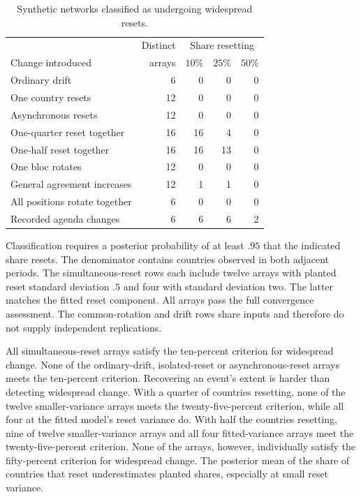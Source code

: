 \documentclass[10pt,authoryear]{elsarticle}
\begin{document}
\begin{table}[ht]
\centering
\small
\caption{Synthetic networks classified as undergoing widespread resets.}
\label{tab:synthetic_results}
\begin{tabular}{lrrrr}
\toprule
 & Distinct & \multicolumn{3}{c}{Share resetting} \\
Change introduced & arrays & $10\%$ & $25\%$ & $50\%$ \\
\midrule
Ordinary drift & 6 & 0 & 0 & 0 \\
One country resets & 12 & 0 & 0 & 0 \\
Asynchronous resets & 12 & 0 & 0 & 0 \\
One-quarter reset together & 16 & 16 & 4 & 0 \\
One-half reset together & 16 & 16 & 13 & 0 \\
One bloc rotates & 12 & 0 & 0 & 0 \\
General agreement increases & 12 & 1 & 1 & 0 \\
All positions rotate together & 6 & 0 & 0 & 0 \\
Recorded agenda changes & 6 & 6 & 6 & 2 \\
\bottomrule
\end{tabular}
\begin{minipage}{.96\textwidth}
\footnotesize Classification requires a posterior probability of at least $.95$ that the indicated share resets. The denominator contains countries observed in both adjacent periods. The simultaneous-reset rows each include twelve arrays with planted reset standard deviation $.5$ and four with standard deviation two. The latter matches the fitted reset component. All arrays pass the full convergence assessment. The common-rotation and drift rows share inputs and therefore do not supply independent replications.
\end{minipage}
\end{table}

All simultaneous-reset arrays satisfy the ten-percent criterion for widespread change. None of the ordinary-drift, isolated-reset or asynchronous-reset arrays meets the ten-percent criterion. Recovering an event’s extent is harder than detecting widespread change. With a quarter of countries resetting, none of the twelve smaller-variance arrays meets the twenty-five-percent criterion, while all four at the fitted model’s reset variance do. With half the countries resetting, nine of twelve smaller-variance arrays and all four fitted-variance arrays meet the twenty-five-percent criterion. None of the arrays, however, individually satisfy the fifty-percent criterion for widespread change. The posterior mean of the share of countries that reset underestimates planted shares, especially at small reset variance.
\end{document}
